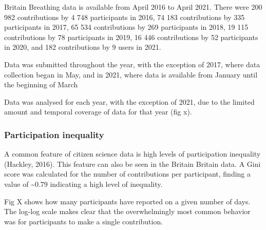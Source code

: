 \documentclass[
]{article}
\newenvironment{Shaded}{\begin{snugshade}}{\end{snugshade}}
\newcommand{\CommentTok}[1]{\textcolor[rgb]{0.56,0.35,0.01}{\textit{#1}}}
\newcommand{\FunctionTok}[1]{\textcolor[rgb]{0.00,0.00,0.00}{#1}}
\newcommand{\NormalTok}[1]{#1}
\newcommand{\OtherTok}[1]{\textcolor[rgb]{0.56,0.35,0.01}{#1}}
\newcommand{\SpecialCharTok}[1]{\textcolor[rgb]{0.00,0.00,0.00}{#1}}
\begin{document}
Britain Breathing data is available from April 2016 to April 2021. There
were 200 982 contributions by 4 748 participants in 2016, 74 183
contributions by 335 participants in 2017, 65 534 contributions by 269
participants in 2018, 19 115 contributions by 78 participants in 2019,
16 446 contributions by 52 participants in 2020, and 182 contributions
by 9 users in 2021.

Data was submitted throughout the year, with the exception of 2017,
where data collection began in May, and in 2021, where data is available
from January until the beginning of March

Data was analysed for each year, with the exception of 2021, due to the
limited amount and temporal coverage of data for that year (fig x).

\hypertarget{participation-inequality}{%
\subsubsection{Participation
inequality}\label{participation-inequality}}

A common feature of citizen science data is high levels of participation
inequality (Hackley, 2016). This feature can also be seen in the Britain
Britain data. A Gini score was calculated for the number of
contributions per participant, finding a value of \textasciitilde0.79
indicating a high level of inequality.

\begin{Shaded}
\end{Shaded}

Fig X shows how many participants have reported on a given number of
days. The log-log scale makes clear that the overwhelmingly most common
behavior was for participants to make a single contribution.
\end{document}
